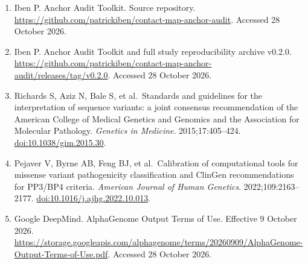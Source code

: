 \documentclass[
  11pt,
]{article}
\begin{document}
\begin{enumerate}
  2020;5(54):2614.
  \href{https://doi.org/10.21105/joss.02614}{doi:10.21105/joss.02614}.
\item
  Iben P. Anchor Audit Toolkit. Source repository.
  \url{https://github.com/patrickiben/contact-map-anchor-audit}.
  Accessed 28 October 2026.
\item
  Iben P. Anchor Audit Toolkit and full study reproducibility archive
  v0.2.0.
  \url{https://github.com/patrickiben/contact-map-anchor-audit/releases/tag/v0.2.0}.
  Accessed 28 October 2026.
\item
  Richards S, Aziz N, Bale S, et al.~Standards and guidelines for the
  interpretation of sequence variants: a joint consensus recommendation
  of the American College of Medical Genetics and Genomics and the
  Association for Molecular Pathology. \emph{Genetics in Medicine}.
  2015;17:405--424.
  \href{https://doi.org/10.1038/gim.2015.30}{doi:10.1038/gim.2015.30}.
\item
  Pejaver V, Byrne AB, Feng BJ, et al.~Calibration of computational
  tools for missense variant pathogenicity classification and ClinGen
  recommendations for PP3/BP4 criteria. \emph{American Journal of Human
  Genetics}. 2022;109:2163--2177.
  \href{https://doi.org/10.1016/j.ajhg.2022.10.013}{doi:10.1016/j.ajhg.2022.10.013}.
\item
  Google DeepMind. AlphaGenome Output Terms of Use. Effective 9 October
  2026.
  \url{https://storage.googleapis.com/alphagenome/terms/20260909/AlphaGenome-Output-Terms-of-Use.pdf}.
  Accessed 28 October 2026.
\end{enumerate}
\end{document}
